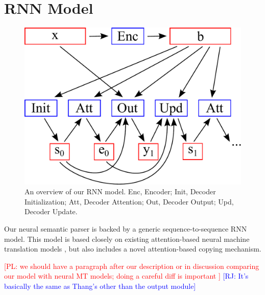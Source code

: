 \documentclass[11pt,letterpaper]{article}
\newcommand\pl[1]{\textcolor{red}{[PL: #1]}}
\newcommand\rj[1]{\textcolor{blue}{[RJ: #1]}}
\begin{document}

\section{RNN Model}
\begin{figure}[t] 
\small
\begin{center} 
  \includegraphics[scale=0.4]{fig-rnn.pdf}
\end{center} 
\caption{An overview of our RNN model.  
  Enc, Encoder; Init, Decoder Initialization;
  Att, Decoder Attention; Out, Decoder Output;
  Upd, Decoder Update.
}
\label{fig:rnn}
\end{figure}
Our neural semantic parser is backed by a generic sequence-to-sequence RNN model.
This model is based closely on existing 
attention-based neural machine translation models
\cite{luong2015translation},
but also includes a novel attention-based copying mechanism.

\pl{we should have a paragraph after our description
  or in discussion comparing our model with neural MT models;
  doing a careful diff is important }
  \rj{It's basically the same as Thang's other than the output module}
\end{document}
